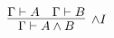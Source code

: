 \documentclass[crop]{standalone} %
\begin{document}
$\displaystyle
\infer[\land I]{
 \Gamma \vdash A \land B
}{
 \Gamma \vdash A 
 &
 \Gamma \vdash B
}
$
\end{document}
